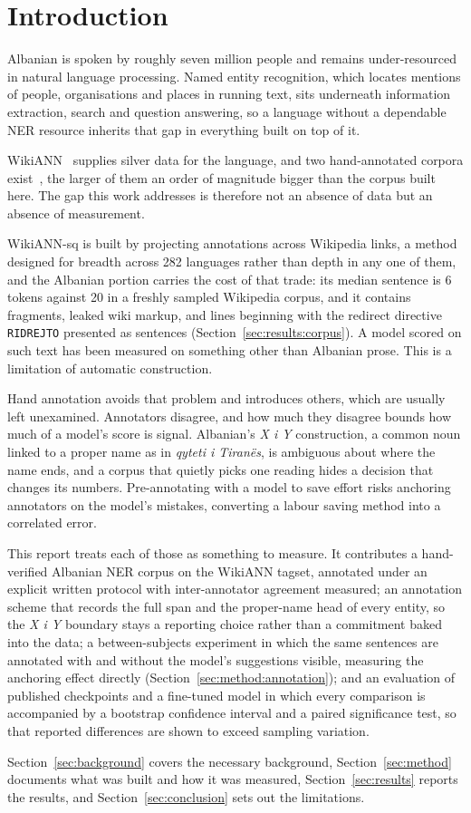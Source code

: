 \section{Introduction}
\label{sec:introduction}

Albanian is spoken by roughly seven million people and remains under-resourced in natural language processing. Named entity recognition, which locates mentions of people,
organisations and places in running text, sits underneath information extraction,
search and question answering, so a language without a dependable NER resource inherits
that gap in everything built on top of it.

WikiANN~\cite{bib:wikiann,bib:wikiann-splits} supplies silver data for the language, and two hand-annotated corpora exist~\cite{bib:albner,bib:kote2025}, the larger of them an order of magnitude bigger than the corpus built here. The gap this
work addresses is therefore not an absence of data but an absence of measurement.

WikiANN-sq is built by projecting annotations across Wikipedia links, a method designed for breadth across 282 languages rather than depth in any one of them, and the Albanian portion carries the cost of that trade: its median sentence is 6 tokens against 20 in a freshly sampled Wikipedia corpus, and it contains fragments, leaked wiki markup, and lines beginning with the redirect directive \texttt{RIDREJTO} presented as sentences (Section~\ref{sec:results:corpus}). A model scored on such text has been measured on something other than Albanian prose. This is a limitation of automatic construction.

Hand annotation avoids that problem and introduces others, which are usually left
unexamined. Annotators disagree, and how much they disagree bounds how much of a model's
score is signal. Albanian's \emph{X i Y} construction, a common noun linked to a proper
name as in \emph{qyteti i Tiranës}, is ambiguous about where the name ends,
and a corpus that quietly picks one reading hides a decision that changes its numbers.
Pre-annotating with a model to save effort risks anchoring annotators on the model's
mistakes, converting a labour saving method into a correlated error.

This report treats each of those as something to measure. It contributes a hand-verified
Albanian NER corpus on the WikiANN tagset, annotated under an explicit written protocol
with inter-annotator agreement measured; an annotation scheme that
records the full span and the proper-name head of every entity, so the \emph{X i Y}
boundary stays a reporting choice rather than a commitment baked into the data; a
between-subjects experiment in which the same sentences are annotated with and without the model's suggestions visible, measuring the anchoring effect directly
(Section~\ref{sec:method:annotation}); and an evaluation of published checkpoints and a
fine-tuned model in which every comparison is accompanied by a bootstrap confidence
interval and a paired significance test, so that reported differences are shown to exceed sampling variation.

Section~\ref{sec:background} covers the necessary background,
Section~\ref{sec:method} documents what was built and how it was measured,
Section~\ref{sec:results} reports the results, and Section~\ref{sec:conclusion} sets out
the limitations.

